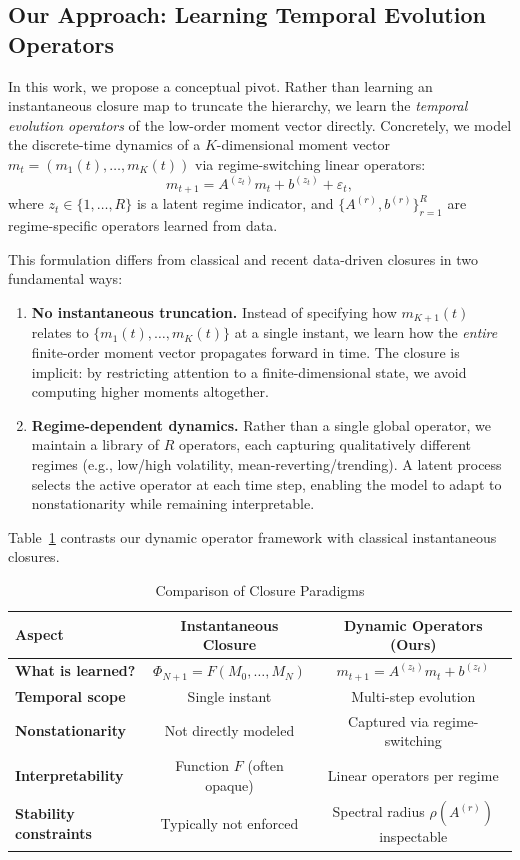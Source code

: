 \documentclass[journal, onecolumn]{IEEEtran}
\begin{document}
\subsection{Our Approach: Learning Temporal Evolution Operators}

In this work, we propose a conceptual pivot. Rather than learning an instantaneous closure map to truncate the hierarchy, we learn the \emph{temporal evolution operators} of the low-order moment vector directly. Concretely, we model the discrete-time dynamics of a $K$-dimensional moment vector $m_t = (m_1(t), \dots, m_K(t))$ via regime-switching linear operators:
\begin{equation}
m_{t+1} = A^{(z_t)} m_t + b^{(z_t)} + \varepsilon_t,
\label{eq:intro_regime}
\end{equation}
where $z_t \in \{1, \dots, R\}$ is a latent regime indicator, and $\{A^{(r)}, b^{(r)}\}_{r=1}^R$ are regime-specific operators learned from data.

This formulation differs from classical and recent data-driven closures in two fundamental ways:
\begin{enumerate}
    \item \textbf{No instantaneous truncation.} Instead of specifying how $m_{K+1}(t)$ relates to $\{m_1(t), \dots, m_K(t)\}$ at a single instant, we learn how the \emph{entire} finite-order moment vector propagates forward in time. The closure is implicit: by restricting attention to a finite-dimensional state, we avoid computing higher moments altogether.
    \item \textbf{Regime-dependent dynamics.} Rather than a single global operator, we maintain a library of $R$ operators, each capturing qualitatively different regimes (e.g., low/high volatility, mean-reverting/trending). A latent process selects the active operator at each time step, enabling the model to adapt to nonstationarity while remaining interpretable.
\end{enumerate}

Table~\ref{tab:closure-comparison} contrasts our dynamic operator framework with classical instantaneous closures.

\begin{table}[h]
\centering
\caption{Comparison of Closure Paradigms}
\label{tab:closure-comparison}
\begin{tabular}{lcc}
\toprule
\textbf{Aspect} & \textbf{Instantaneous Closure} & \textbf{Dynamic Operators (Ours)} \\
\midrule
\textbf{What is learned?} & $\Phi_{N+1} = F(M_0, \dots, M_N)$ & $m_{t+1} = A^{(z_t)} m_t + b^{(z_t)}$ \\
\textbf{Temporal scope} & Single instant & Multi-step evolution \\
\textbf{Nonstationarity} & Not directly modeled & Captured via regime-switching \\
\textbf{Interpretability} & Function $F$ (often opaque) & Linear operators per regime \\
\textbf{Stability constraints} & Typically not enforced & Spectral radius $\rho(A^{(r)})$ inspectable \\
\bottomrule
\end{tabular}
\end{table}
\end{document}

